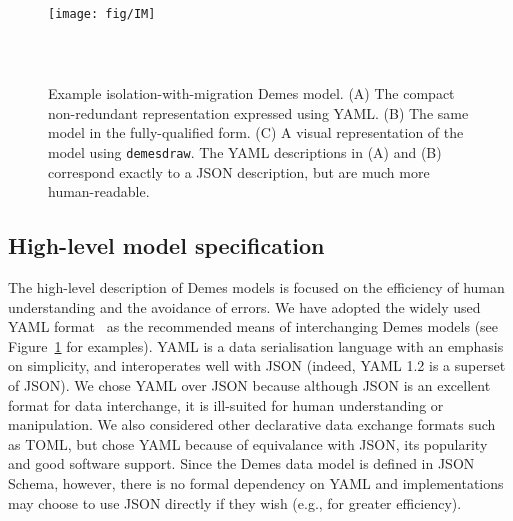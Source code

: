 \documentclass[11pt]{article}
\begin{document}
\begin{figure}
\begin{minipage}{0.48\textwidth}
\begin{tcolorbox}
\inputminted[fontsize=\scriptsize,linenos,numbersep=5pt]{yaml}{models/IM.yaml}
\end{tcolorbox}
\begin{tcolorbox}
\texttt{[image: fig/IM]}
\end{tcolorbox}
\end{minipage}\hfill
\begin{minipage}{0.48\textwidth}
\begin{tcolorbox}
\inputminted[fontsize=\scriptsize,linenos,numbersep=5pt]{yaml}{models/IM-resolved.yaml}
\end{tcolorbox}
\end{minipage}\\
\caption{\label{fig-example}
Example isolation-with-migration Demes model. (A) The compact non-redundant
representation expressed using YAML. (B) The same model in the fully-qualified
form. (C) A visual representation of the model using \texttt{demesdraw}.
The YAML descriptions in (A) and (B) correspond exactly to a JSON description,
but are much more human-readable.
}
\end{figure}


\subsection*{High-level model specification}

The high-level description of Demes models is focused on the efficiency of
human understanding and the avoidance of errors. We have adopted the widely
used YAML format~\citep{ben2009yaml} as the recommended means of interchanging
Demes models (see Figure~\ref{fig-example} for examples). YAML is a data
serialisation language with an emphasis on simplicity, and interoperates well
with JSON (indeed, YAML 1.2 is a superset of JSON). We chose YAML over JSON
because although JSON is an excellent format for data interchange, it is
ill-suited for human understanding or manipulation. We also considered other
declarative data exchange formats such as TOML,
but chose YAML because of equivalance with JSON,
its popularity and good software support.
Since the Demes data model is defined in JSON Schema,
however, there is no formal dependency on YAML and implementations may choose
to use JSON directly if they wish (e.g., for greater efficiency).
\end{document}
